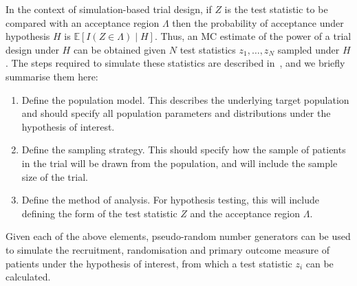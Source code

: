 \documentclass{article} %
\begin{document}
In the context of simulation-based trial design, if $Z$ is the test statistic to be compared with an acceptance region $\Lambda$ then the probability of acceptance under hypothesis $H$ is $\mathbb{E}[I(Z \in \Lambda) \mid H]$. Thus, an MC estimate of the power of a trial design under $H$ can be obtained given $N$ test statistics $z_{1}, \ldots , z_{N}$ sampled under $H$. The steps required to simulate these statistics are described in~\cite{Landau2013}, and we briefly summarise them here:
\begin{enumerate}
\item Define the population model. This describes the underlying target population and should specify all population parameters and distributions under the hypothesis of interest.
\item Define the sampling strategy. This should specify how the sample of patients in the trial will be drawn from the population, and will include the sample size of the trial.
\item Define the method of analysis. For hypothesis testing, this will include defining the form of the test statistic $Z$ and the acceptance region $\Lambda$.
\end{enumerate}
Given each of the above elements, pseudo-random number generators can be used to simulate the recruitment, randomisation and primary outcome measure of patients under the hypothesis of interest, from which a test statistic $z_{i}$ can be calculated. 

\end{document}
